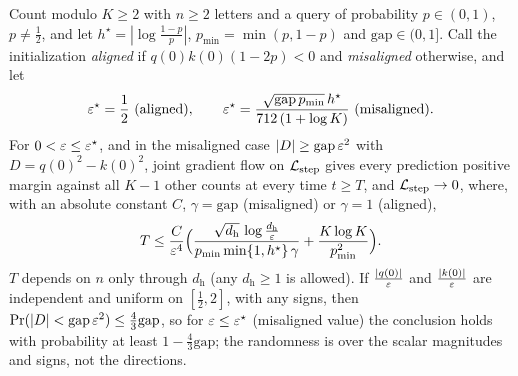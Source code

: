 \begin{theorem}
\label{thm:joint}
Count modulo $K\ge2$ with $n\ge2$ letters and a query of probability $p\in(0,1)$, $p\neq\tfrac{1}{2}$, and let $h^\star=|\log\tfrac{1-p}{p}|$,
$p_{\min}=\min(p,1-p)$ and $\mathrm{gap}\in(0,1]$. Call the initialization \emph{aligned} if $q(0)k(0)(1-2p)<0$ and \emph{misaligned} otherwise, and let
\[
 \initscale^\star=\tfrac{1}{2}\ \text{(aligned)},\qquad \initscale^\star=\frac{\sqrt{\mathrm{gap}\,p_{\min}}\,h^\star}{712\,(1+\log K)}\ \text{(misaligned)}.
\]
For $0<\varepsilon\le\varepsilon^\star$, and in the misaligned case $|D|\ge\mathrm{gap}\,\varepsilon^2$ with $D=q(0)^2-k(0)^2$, joint gradient flow on $\mathcal L_{\mathrm{step}}$ gives
every prediction positive margin against all $K-1$ other counts at every time $t\ge T$, and $\mathcal L_{\mathrm{step}}\to0$, where, with an absolute constant $C$,
$\gamma=\mathrm{gap}$ (misaligned) or $\gamma=1$ (aligned),
\[
 T\le\frac{C}{\varepsilon^4}\Bigl(\frac{\sqrt{d_{\mathrm h}}\,\log\frac{d_{\mathrm h}}{\varepsilon}}{p_{\min}\min\{1,h^\star\}\,\gamma}+\frac{K\log K}{p_{\min}^2}\Bigr).
\]
$T$ depends on $n$ only through $d_{\mathrm h}$ (any $d_{\mathrm h}\ge1$ is allowed). If $\frac{|q(0)|}{\varepsilon}$ and $\frac{|k(0)|}{\varepsilon}$ are independent and uniform on
$[\tfrac{1}{2},2]$, with any signs, then $\Pr(|D|<\mathrm{gap}\,\initscale^2)\le\tfrac{4}{3}\mathrm{gap}$, so for $\varepsilon\le\varepsilon^\star$ (misaligned value) the conclusion holds with
probability at least $1-\tfrac{4}{3}\mathrm{gap}$; the randomness is over the scalar magnitudes and signs, not the directions.
\end{theorem}

